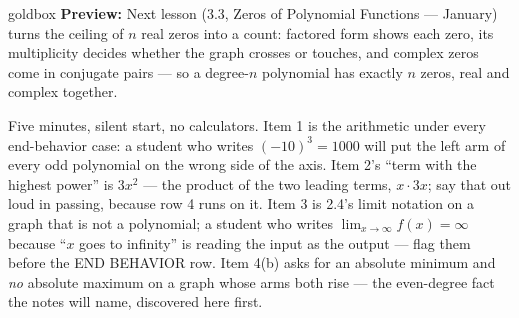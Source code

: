 \documentclass[10pt]{article}
\begin{document}
\begin{skillbox}{goldbox}
\textbf{Preview:} Next lesson (3.3, Zeros of Polynomial Functions --- January) turns the
ceiling of $n$ real zeros into a count: factored form shows each zero, its multiplicity
decides whether the graph crosses or touches, and complex zeros come in conjugate pairs ---
so a degree-$n$ polynomial has exactly $n$ zeros, real and complex together.
\end{skillbox}

\begin{teachernote}[Warm-Up]
Five minutes, silent start, no calculators. Item 1 is the arithmetic under every end-behavior
case: a student who writes $(-10)^3 = 1000$ will put the left arm of every odd polynomial on
the wrong side of the axis. Item 2's ``term with the highest power'' is $3x^2$ --- the product
of the two leading terms, $x \cdot 3x$; say that out loud in passing, because row 4 runs on
it. Item 3 is 2.4's limit notation on a graph that is not a polynomial; a student who writes
$\lim_{x \to \infty} f(x) = \infty$ because ``$x$ goes to infinity'' is reading the input as
the output --- flag them before the END BEHAVIOR row. Item 4(b) asks for an absolute minimum
and \emph{no} absolute maximum on a graph whose arms both rise --- the even-degree fact the
notes will name, discovered here first.
\end{teachernote}
\end{document}
